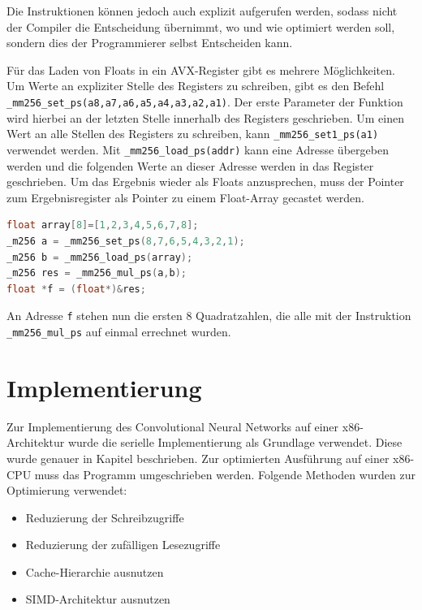 \documentclass[../main.tex]{subfiles}
\begin{document}
Die Instruktionen können jedoch auch explizit aufgerufen werden, sodass nicht der Compiler die Entscheidung übernimmt, wo und wie optimiert werden soll, sondern dies der Programmierer selbst Entscheiden kann. 

Für das Laden von Floats in ein AVX-Register gibt es mehrere Möglichkeiten. Um Werte an expliziter Stelle des Registers zu schreiben, gibt es den Befehl \texttt{\_mm256\_set\_ps(a8,a7,a6,a5,a4,a3,a2,a1)}. Der erste Parameter der Funktion wird hierbei an der letzten Stelle innerhalb des Registers geschrieben. Um einen Wert an alle Stellen des Registers zu schreiben, kann \texttt{\_mm256\_set1\_ps(a1)} verwendet werden. Mit \texttt{\_mm256\_load\_ps(addr)} kann eine Adresse übergeben werden und die folgenden Werte an dieser Adresse werden in das Register geschrieben. 
Um das Ergebnis wieder als Floats anzusprechen, muss der Pointer zum Ergebnisregister als Pointer zu einem Float-Array gecastet werden.

\begin{lstlisting}[language=c++, caption=Multiplikation mit AVX, captionpos=b, label=listing:avx_multiplikation, frame=single, linewidth=\textwidth, breaklines=true]
float array[8]=[1,2,3,4,5,6,7,8];
_m256 a = _mm256_set_ps(8,7,6,5,4,3,2,1);
_m256 b = _mm256_load_ps(array);
_m256 res = _mm256_mul_ps(a,b);
float *f = (float*)&res;
\end{lstlisting}
An Adresse \texttt{f} stehen nun die ersten 8 Quadratzahlen, die alle mit der Instruktion \texttt{\_mm256\_mul\_ps} auf einmal errechnet wurden.


\section{Implementierung}

Zur Implementierung des Convolutional Neural Networks auf einer x86-Architektur wurde die serielle Implementierung als Grundlage verwendet. Diese wurde genauer in Kapitel  beschrieben. Zur optimierten Ausführung auf einer x86-CPU muss das Programm umgeschrieben werden. Folgende Methoden wurden zur Optimierung verwendet:
\begin{itemize}
	\item Reduzierung der Schreibzugriffe
	\item Reduzierung der zufälligen Lesezugriffe
	\item Cache-Hierarchie ausnutzen
	\item SIMD-Architektur ausnutzen
\end{itemize}
\end{document}
